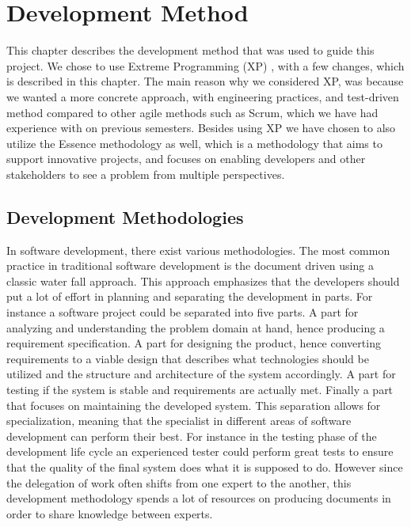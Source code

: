 
\chapter{Development Method}
\label{cha:development_method}

This chapter describes the development method that was used to guide this project. We chose to use Extreme Programming (XP) \parencite{xp}, with a few changes, which is described in this chapter. The main reason why we considered XP, was because we wanted a more concrete approach, with engineering practices, and test-driven method compared to other agile methods such as Scrum, which we have had experience with on previous semesters. Besides using XP we have chosen to also utilize the Essence methodology \parencite{essence_book} as well, which is a methodology that aims to support innovative projects, and focuses on enabling developers and other stakeholders to see a problem from multiple perspectives. 

\section{Development Methodologies}
\label{sec:development_methodologies}

In software development, there exist various methodologies. The most common practice in traditional software development is the document driven using a classic water fall approach. This approach emphasizes that the developers should put a lot of effort in planning and separating the development in parts. For instance a software project could be separated into five parts. A part for analyzing and understanding the problem domain at hand, hence producing a requirement specification. A part for designing the product, hence converting requirements to a viable design that describes what technologies should be utilized and the structure and architecture of the system accordingly. A part for testing if the system is stable and requirements are actually met. Finally a part that focuses on maintaining the developed system. This separation allows for specialization, meaning that the specialist in different areas of software development can perform their best. For instance in the testing phase of the development life cycle an experienced tester could perform great tests to ensure that the quality of the final system does what it is supposed to do. However since the delegation of work often shifts from one expert to the another, this development methodology spends a lot of resources on producing documents in order to share knowledge between experts. 






